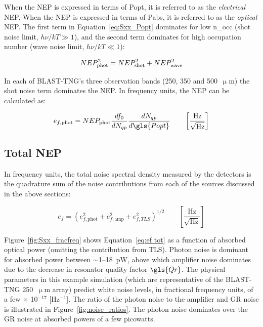 When the NEP is expressed in terms of \gls{Popt}, it is referred to as the \textit{electrical} NEP\@. When the NEP is expressed in terms of \gls{Pabs}, it is referred to as the \textit{optical} NEP\@. The first term in Equation~\ref{eq:Sxx_Popt} dominates for low \gls{n_occ} (shot noise limit, $h\nu / kT \gg 1$), and the second term dominates for high occupation number (wave noise limit, $h\nu / kT \ll 1$):

\begin{equation}\label{eq:NEP phot}
NEP_{\mathrm{phot}}^{2} = NEP_{\mathrm{shot}}^{2} + NEP_{\mathrm{wave}}^{2} \\
\end{equation}

In each of BLAST-TNG's three observation bands (250, 350 and 500~$\upmu$m) the shot noise term dominates the NEP\@. In frequency units, the NEP can be calculated as:

\begin{equation} \label{eq:ef phot}
  e_{f,\mathrm{phot}} = NEP_{\mathrm{phot}}\frac{df_{0}}{dN_{qp}}\frac{dN_{qp}}{d\gls{Popt}} \qquad \left[ \frac{\mathrm{Hz}}{\sqrt{\mathrm{Hz}}} \right]
\end{equation}

\subsection{Total NEP}

In frequency units, the total noise spectral density measured by the detectors is the quadrature sum of the noise contributions from each of the sources discussed in the above sections:

\begin{equation} \label{eq:ef tot}
  e_{f} = \left( e_{f,\mathrm{phot}}^{2}  + e_{f,\mathrm{amp}}^{2} + e_{f,TLS}^{2} \right)^{1/2} \qquad \left[ \frac{\mathrm{Hz}}{\sqrt{\mathrm{Hz}}} \right]
\end{equation}

Figure~\ref{fig:Sxx_fracfreq} shows Equation~\ref{eq:ef tot} as a function of absorbed optical power (omitting the contribution from TLS). Photon noise is dominant for absorbed power between $\sim$1--18~pW, above which amplifier noise dominates due to the decrease in resonator quality factor $\gls{Qr}$. The physical parameters in this example simulation (which are representative of the BLAST-TNG 250~$\upmu$m array) predict white noise levels, in fractional frequency units, of a few $\times$  10$^{-17}$ [Hz$^{-1}$]. The ratio of the photon noise to the amplifier and GR noise is illustrated in Figure~\ref{fig:noise_ratios}. The photon noise dominates over the GR noise at absorbed powers of a few picowatts.

